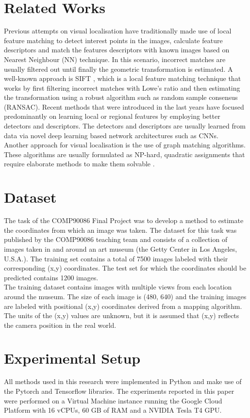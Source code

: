 \documentclass[conference]{IEEEtran}
\begin{document}
\section{Related Works}
Previous attempts on visual localisation have traditionally made use of local feature matching to detect interest points in the images, calculate feature descriptors and match the features descriptors with known images based on Nearest Neighbour (NN) technique. In this scenario, incorrect matches are usually filtered out until finally the geometric transformation is estimated. A well-known approach is SIFT \cite{b4}, which is a local feature matching technique that works by first filtering incorrect matches with Lowe’s ratio and then estimating the transformation using a robust algorithm such as random sample consensus (RANSAC). 
Recent methods that were introduced in the last years have focused predominantly on learning local or regional features by employing better detectors and descriptors. The detectors and descriptors are usually learned from data via novel deep learning based network architectures such as CNNs.\\
Another approach for visual localisation is the use of graph matching algorithms. These algorithms are usually formulated as NP-hard, quadratic assignments\cite{b5} that require elaborate methods to make them solvable \cite{b6}.\\

\section{Dataset}
The task of the COMP90086 Final Project was to develop a method to estimate the coordinates from which an image was taken. The dataset for this task was published by the COMP90086 teaching team and consists of a collection of images taken in and around an art museum (the Getty Center in Los Angeles, U.S.A.). The training set contains a total of 7500 images labeled with their corresponding (x,y) coordinates. The test set for which the coordinates should be predicted contains 1200 images. \\
The training dataset contains images with multiple views from each location around the museum. The size of each image is (480, 640) and the training images are labeled with positional (x,y) coordinates derived from a mapping algorithm. The units of the (x,y) values are unknown, but it is assumed that (x,y) reflects the camera position in the real world. 


\section{Experimental Setup}
All methods used in this research were implemented in Python and make use of the Pytorch \cite{b7} and Tensorflow \cite{b8} libraries. The experiments reported in this paper were performed on a Virtual Machine instance running the Google Cloud Platform with 16 vCPUs, 60 GB of RAM and a NVIDIA Tesla T4 GPU.
\end{document}
